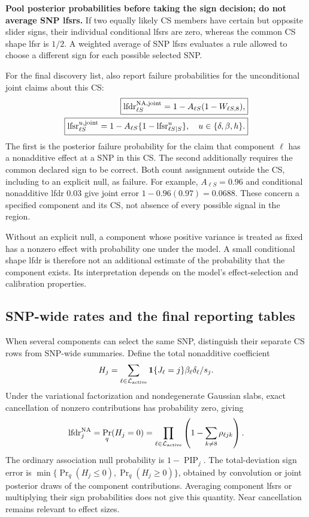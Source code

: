 \documentclass[11pt]{article}
\newcommand{\ind}{\mathbf 1}
\begin{document}
\textbf{Pool posterior probabilities before taking the sign decision;
do not average SNP lfsrs.} If two equally likely CS members have certain
but opposite slider signs, their individual conditional lfsrs are zero,
whereas the common CS shape lfsr is $1/2$. A weighted average of SNP lfsrs
evaluates a rule allowed to choose a different sign for each possible
selected SNP.

For the final discovery list, also report failure probabilities for the
unconditional joint claims about this CS:
\begin{align}
 \boxed{\operatorname{lfdr}^{\rm NA,joint}_{\ell S}
       =1-A_{\ell S}(1-W_{\ell S,8}),}\nonumber\\
 \boxed{\operatorname{lfsr}^{u,\rm joint}_{\ell S}
       =1-A_{\ell S}
             \{1-\operatorname{lfsr}^{u}_{\ell S\mid S}\},
       \quad u\in\{\delta,\beta,h\}.}
 \label{eq:cs-joint-errors}
\end{align}
The first is the posterior failure probability for the claim that
component $\ell$ has a nonadditive effect at a SNP in this CS.
The second additionally requires the common declared sign to be correct.
Both count assignment outside the CS, including to an explicit null,
as failure. For example, $A_{\ell S}=0.96$ and conditional nonadditive
lfdr $0.03$ give joint error $1-0.96(0.97)=0.0688$.
These concern a specified component and its CS, not absence of every
possible signal in the region.

Without an explicit null, a component whose positive variance is treated
as fixed has a nonzero effect with probability one under the model.
A small conditional shape lfdr is therefore not an additional estimate of
the probability that the component exists. Its interpretation depends on
the model's effect-selection and calibration properties.

\subsection{SNP-wide rates and the final reporting tables}
\label{sec:reporting-errors}
When several components can select the same SNP, distinguish their separate
CS rows from SNP-wide summaries. Define the total nonadditive coefficient
\begin{equation}
 H_j=\sum_{\ell\in\mathcal L_{\rm active}}
       \ind\{J_\ell=j\}\beta_\ell\delta_\ell/s_j.
\end{equation}
Under the variational factorization and nondegenerate Gaussian slabs,
exact cancellation of nonzero contributions has probability zero, giving
\begin{equation}
 \operatorname{lfdr}^{\rm NA}_j=\Pr_q(H_j=0)
 =\prod_{\ell\in\mathcal L_{\rm active}}
     \left(1-\sum_{k\ne8}\rho_{\ell jk}\right).
 \label{eq:snp-global-nonadd}
\end{equation}
The ordinary association null probability is $1-\operatorname{PIP}_j$.
The total-deviation sign error is
$\min\{\Pr_q(H_j\leq0),\Pr_q(H_j\geq0)\}$, obtained by convolution or
joint posterior draws of the component contributions. Averaging component
lfsrs or multiplying their sign probabilities does not give this quantity.
Near cancellation remains relevant to effect sizes.
\end{document}
